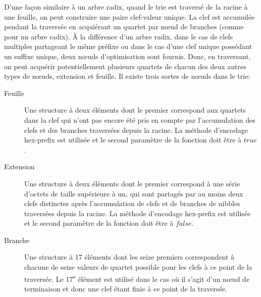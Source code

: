 \documentclass[9pt,oneside]{amsart}
\begin{document}
D'une façon similaire à un arbre radix, quand le trie est traversé de la racine à une feuille, on peut construire une paire clef-valeur unique. La clef est accumulée pendant la traversée en acquiérant un quartet par n\oe{}ud de branches (comme pour un arbre radix). À la différence d'un arbre radix, dans le cas de clefs multiples partageant le même préfixe ou dans le cas d'une clef unique possédant un suffixe unique, deux n\oe{}uds d'optimisation sont fournis. Donc, en traversant, on peut acquérir potentiellement plusieurs quartets de chacun des deux autres types de n\oe{}uds, extension et feuille. Il existe trois sortes de n\oe{}uds dans le trie:
\begin{description}
\item[Feuille]
  Une structure à deux éléments dont le premier correspond aux quartets dans la clef qui n'ont pas encore été pris en compte par l'accumulation des clefs et des branches traversées depuis la racine. La méthode d'encodage hex-prefix est utilisée et le second paramètre de la fonction doit être à $true$.
\item[Extension]
  Une structure à deux éléments dont le premier correspond à une série d'octets de taille supérieure à un, qui sont partagés par au moins deux clefs distinctes après l'accumulation de clefs et de branches de nibbles traversées depuis la racine. La méthode d'encodage hex-prefix est utilisée et le second paramètre de la fonction doit être à $false$.
\item[Branche]
  Une structure à 17 éléments dont les seize premiers correspondent à chacune de seize valeurs de quartet possible pour les clefs à ce point de la traversée. Le 17\textsuperscript{e} élément est utilisé dans le cas où il s'agit d'un n\oe{}ud de terminaison et donc une clef étant finie à ce point de la traversée.
\end{description}
\end{document}
